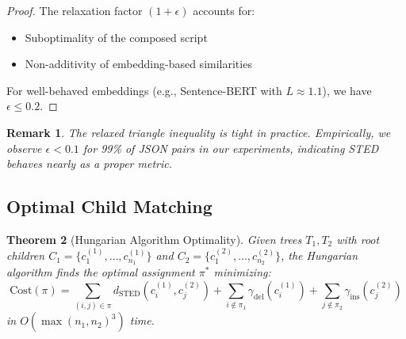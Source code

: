 \documentclass{article}
\newtheorem{theorem}{Theorem}
\newtheorem{remark}[theorem]{Remark}
\begin{document}
\begin{proof}
The relaxation factor $(1+\epsilon)$ accounts for:
\begin{itemize}
    \item Suboptimality of the composed script
    \item Non-additivity of embedding-based similarities
\end{itemize}
For well-behaved embeddings (e.g., Sentence-BERT with $L \approx 1.1$), we have $\epsilon \leq 0.2$.
\end{proof}

\begin{remark}
The relaxed triangle inequality is tight in practice. Empirically, we observe $\epsilon < 0.1$ for 99\% of JSON pairs in our experiments, indicating STED behaves nearly as a proper metric.
\end{remark}

\subsection{Optimal Child Matching}

\begin{theorem}[Hungarian Algorithm Optimality]
\label{thm:hungarian}
Given trees $T_1, T_2$ with root children $C_1 = \{c_1^{(1)}, \ldots, c_{n_1}^{(1)}\}$ and $C_2 = \{c_1^{(2)}, \ldots, c_{n_2}^{(2)}\}$, the Hungarian algorithm finds the optimal assignment $\pi^*$ minimizing:
\begin{equation}
    \text{Cost}(\pi) = \sum_{(i,j) \in \pi} d_{\text{STED}}(c_i^{(1)}, c_j^{(2)}) + \sum_{i \notin \pi_1} \gamma_{\text{del}}(c_i^{(1)}) + \sum_{j \notin \pi_2} \gamma_{\text{ins}}(c_j^{(2)})
\end{equation}
in $O(\max(n_1, n_2)^3)$ time.
\end{theorem}
\end{document}
